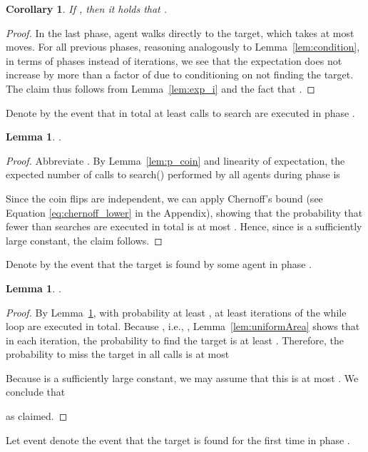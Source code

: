 \documentclass[11pt]{article}
\newtheorem{lemma}[theorem]{Lemma}
\newtheorem{corollary}[theorem]{Corollary}
\begin{document}
\begin{corollary}
\label{coro:time}
	If , then it holds that .
\end{corollary}
\begin{proof}
In the last phase, agent  walks directly to the target, which takes at most  moves. For all previous phases, reasoning analogously to Lemma~\ref{lem:condition}, in terms of phases instead of iterations, we see that the expectation does not increase by more than a factor of  due to conditioning on not finding the target. The claim thus follows from Lemma~\ref{lem:exp_i} and the fact that .
\end{proof}

Denote by  the event that in total at least  calls to search are executed in phase .

\begin{lemma}
\label{lem:whileLoop}
	.
\end{lemma}
\begin{proof}
Abbreviate . By Lemma~\ref{lem:p_coin} and linearity of expectation, the expected number of calls to search() performed by all agents during phase  is


Since the coin flips are independent, we can apply Chernoff's bound (see Equation \eqref{eq:chernoff_lower} in the Appendix), showing that the probability that fewer than  searches are executed in total is at most . Hence, since  is a sufficiently large constant, the claim follows.
\end{proof}

Denote by  the event that the target is found by some agent in phase .

\begin{lemma}
\label{lem:probFind}
	 .
\end{lemma}
\begin{proof}
By Lemma~\ref{lem:whileLoop}, with probability at least , at least  iterations of the while loop are executed in total. Because , i.e., , Lemma~\ref{lem:uniformArea} shows that in each iteration, the probability to find the target is at least . Therefore, the probability to miss the target in all calls is at most

Because  is a sufficiently large constant, we may assume that this is at most . We conclude that

as claimed.
\end{proof}

Let event  denote the event that the target is found for the first time in phase .
\end{document}
